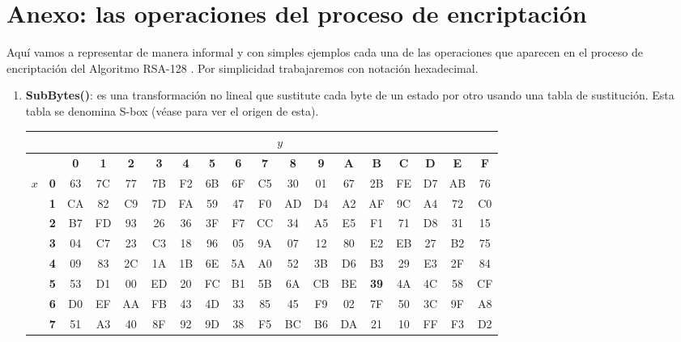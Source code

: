 \newpage

\section*{Anexo: las operaciones del proceso de encriptación}\label{Anexo}
Aquí vamos a representar de manera informal y con simples ejemplos cada una de las operaciones que aparecen en el proceso de encriptación del Algoritmo RSA-128 . Por simplicidad trabajaremos con notación hexadecimal.
\begin{enumerate}
\item {\bf SubBytes(\cdot)}: es una transformación no lineal que sustitute cada byte de un estado por otro usando una tabla de sustitución. Esta tabla se denomina S-box (véase \cite{Federal} para ver el origen de esta).
\begin{table}[ht!]
\begin{center}
\tiny{
\begin{tabular}{|c|c|c|c|c|c|c|c|c|c|c|c|c|c|c|c|c|c|}\hline
& & \multicolumn{16}{c|}{$y$}\\\hline
& &{\textbf 0} & {\textbf 1} & {\textbf 2} & {\textbf 3} & {\textbf 4} & {\textbf 5} & {\textbf 6} & {\textbf 7} & {\textbf 8} & {\textbf 9} & {\textbf A} & {\textbf B} & {\textbf C} & {\textbf D} & {\textbf E} & {\textbf F}\\
\multirow{16}{*}{$x$} & {\textbf 0} & 63 & 7C & 77 & 7B & F2 & 6B & 6F & C5 & 30 & 01 & 67 & 2B & FE & D7 & AB & 76 \\
                    & {\textbf 1} & CA & 82 & C9 & 7D & FA & 59 & 47 & F0 & AD & D4 & A2 & AF & 9C & A4 & 72 & C0 \\
                    & {\textbf 2} & B7 & FD & 93 & 26 & 36 & 3F & F7 & CC & 34 & A5 & E5 & F1 & 71 & D8 & 31 & 15 \\
                    & {\textbf 3} & 04 & C7 & 23 & C3 & 18 & 96 & 05 & 9A & 07 & 12 & 80 & E2 & EB & 27 & B2 & 75 \\
                    & {\textbf 4} & 09 & 83 & 2C & 1A & 1B & 6E & 5A & A0 & 52 & 3B & D6 & B3 & 29 & E3 & 2F & 84 \\
                    & {\textbf 5} & 53 & D1 & 00 & ED & 20 & FC & B1 & 5B & 6A & CB & BE & \textbf{39} & 4A & 4C & 58 & CF \\
                    & {\textbf 6} & D0 & EF & AA & FB & 43 & 4D & 33 & 85 & 45 & F9 & 02 & 7F & 50 & 3C & 9F & A8 \\
                    & {\textbf 7} & 51 & A3 & 40 & 8F & 92 & 9D & 38 & F5 & BC & B6 & DA & 21 & 10 & FF & F3 & D2 \\

\end{tabular}}
\end{center}
\end{table}
\end{enumerate}
